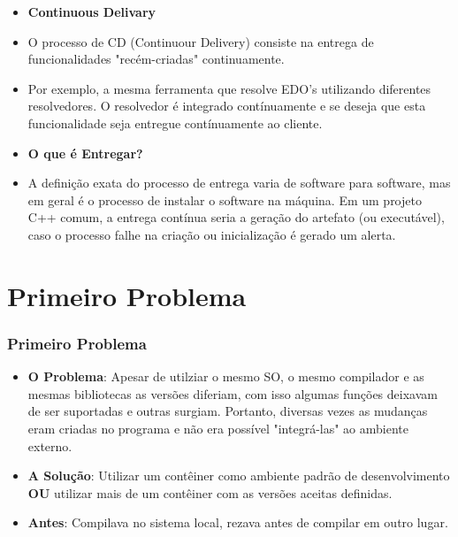 \documentclass[10pt]{beamer}
\theoremstyle{remark}
\theoremstyle{definition}
\begin{document}
\begin{frame}[allowframebreaks]
\begin{itemize}
	\end{itemize}
	
	\framebreak
	
	\begin{itemize}
		\item \textbf{Continuous Delivary}
		
		\item O processo de CD (Continuour Delivery) consiste na entrega de funcionalidades "recém-criadas" continuamente.
		
		\item Por exemplo, a mesma ferramenta que resolve EDO's utilizando diferentes resolvedores. O resolvedor é integrado contínuamente e se deseja que esta funcionalidade seja entregue contínuamente ao cliente.
		
	\end{itemize}
	
	\framebreak
	
	\begin{itemize}
		\item \textbf{O que é Entregar?}
		
		\item A definição exata do processo de entrega varia de software para software, mas em geral é o processo de instalar o software na máquina. Em um projeto C++ comum, a entrega contínua seria a geração do artefato (ou executável), caso o processo falhe na criação ou inicialização é gerado um alerta.
		
	\end{itemize}
\end{frame}

\section{Primeiro Problema}
\begin{frame}[allowframebreaks]
\frametitle{Primeiro Problema}
	\begin{itemize}
	
		\item \textbf{O Problema}: Apesar de utilziar o mesmo SO, o mesmo compilador e as mesmas bibliotecas as versões diferiam, com isso algumas funções deixavam de ser suportadas e outras surgiam. Portanto, diversas vezes as mudanças eram criadas no programa e não era possível "integrá-las" ao ambiente externo. 
		
		\item \textbf{A Solução}: Utilizar um contêiner como ambiente padrão de desenvolvimento \textbf{OU} utilizar mais de um contêiner com as versões aceitas definidas.

		\item \textbf{Antes}: Compilava no sistema local, rezava antes de compilar em outro lugar.
		
	\end{itemize}
\end{frame}
	
\end{document}
